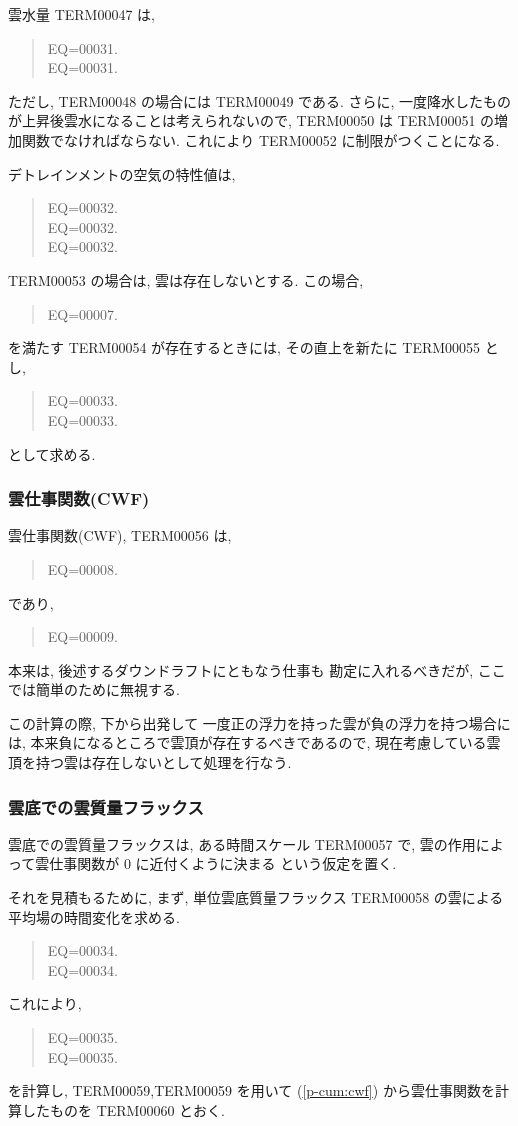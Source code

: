 雲水量 TERM00047 は,
\begin{quote}
\nonumber
EQ=00031.\\
EQ=00031.
\end{quote}
ただし, TERM00048 の場合には TERM00049 である.
さらに, 一度降水したものが上昇後雲水になることは考えられないので,
TERM00050 は TERM00051 の増加関数でなければならない.
これにより TERM00052 に制限がつくことになる.

デトレインメントの空気の特性値は,
\begin{quote}
EQ=00032.\\
EQ=00032.\\
EQ=00032.
\end{quote}

TERM00053 の場合は,
雲は存在しないとする. この場合,
\begin{quote}
EQ=00007.
\end{quote}
を満たす TERM00054 が存在するときには,
その直上を新たに TERM00055 とし,
\begin{quote}
EQ=00033.\\
EQ=00033.
\end{quote}
として求める.

\subsubsection{雲仕事関数(CWF)}

雲仕事関数(CWF), TERM00056 は,
\begin{quote}
EQ=00008.
\end{quote}
であり,
\begin{quote}
EQ=00009.
\label{p-cum:cwf}
\end{quote}
本来は, 後述するダウンドラフトにともなう仕事も
勘定に入れるべきだが, ここでは簡単のために無視する.

この計算の際, 下から出発して
一度正の浮力を持った雲が負の浮力を持つ場合には,
本来負になるところで雲頂が存在するべきであるので,
現在考慮している雲頂を持つ雲は存在しないとして処理を行なう.

\subsubsection{雲底での雲質量フラックス}

雲底での雲質量フラックスは,
ある時間スケール TERM00057 で,
雲の作用によって雲仕事関数が 0 に近付くように決まる
という仮定を置く.

それを見積もるために, まず, 単位雲底質量フラックス TERM00058 の雲による
平均場の時間変化を求める.
\begin{quote}
EQ=00034.\\
EQ=00034.
\end{quote}
これにより,
\begin{quote}
EQ=00035.\\
EQ=00035.
\end{quote}
を計算し, TERM00059,TERM00059 を用いて
(\ref{p-cum:cwf}) から雲仕事関数を計算したものを TERM00060 とおく.

